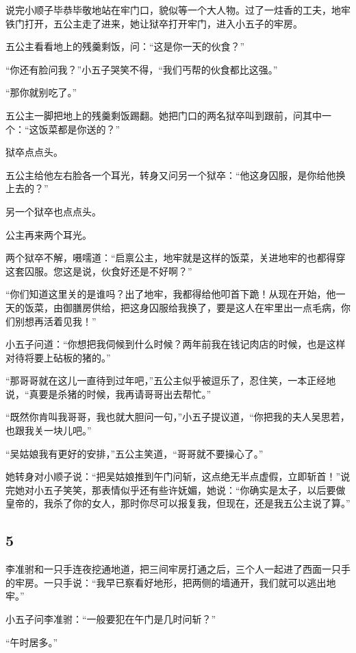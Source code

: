 说完小顺子毕恭毕敬地站在牢门口，貌似等一个大人物。过了一炷香的工夫，地牢铁门打开，五公主走了进来，她让狱卒打开牢门，进入小五子的牢房。

五公主看看地上的残羹剩饭，问：“这是你一天的伙食？”

“你还有脸问我？”小五子哭笑不得，“我们丐帮的伙食都比这强。”

“那你就别吃了。”

五公主一脚把地上的残羹剩饭踢翻。她把门口的两名狱卒叫到跟前，问其中一个：“这饭菜都是你送的？”

狱卒点点头。

五公主给他左右脸各一个耳光，转身又问另一个狱卒：“他这身囚服，是你给他换上去的？”

另一个狱卒也点点头。

公主再来两个耳光。

两个狱卒不解，嗫嚅道：“启禀公主，地牢就是这样的饭菜，关进地牢的也都得穿这套囚服。您这是说，伙食好还是不好啊？”

“你们知道这里关的是谁吗？出了地牢，我都得给他叩首下跪！从现在开始，他一天的饭菜，由御膳房供给，把这身囚服给我换了，要是这人在牢里出一点毛病，你们别想再活着见我！”

小五子问道：“你想把我伺候到什么时候？两年前我在钱记肉店的时候，也是这样对待将要上砧板的猪的。”

“那哥哥就在这儿一直待到过年吧，”五公主似乎被逗乐了，忍住笑，一本正经地说，“真要是杀猪的时候，我再请哥哥出去帮忙。”

“既然你肯叫我哥哥，我也就大胆问一句，”小五子提议道，“你把我的夫人吴思若，也跟我关一块儿吧。”

“吴姑娘我有更好的安排，”五公主笑道，“哥哥就不要操心了。”

她转身对小顺子说：“把吴姑娘推到午门问斩，这点绝无半点虚假，立即斩首！”说完她对小五子笑笑，那表情似乎还有些许妩媚，她说：“你确实是太子，以后要做皇帝的，我杀了你的女人，那时你尽可以报复我，但现在，还是我五公主说了算。”
\newline

{\centering\subsection{5}}

李准驸和一只手连夜挖通地道，把三间牢房打通之后，三个人一起进了西面一只手的牢房。一只手说：“我早已察看好地形，把两侧的墙通开，我们就可以逃出地牢。”

小五子问李准驸：“一般要犯在午门是几时问斩？”

“午时居多。”

